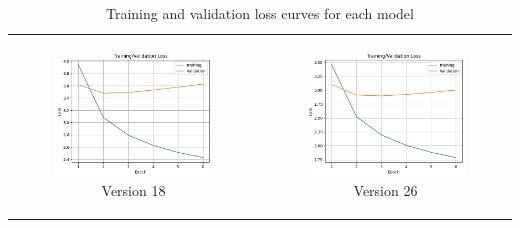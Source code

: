 \begin{table}[ht]
\begin{tabular}{cc}
    \begin{subfigure}{0.45\textwidth}
      \includegraphics[width=\linewidth]{img/curve_18.png}
      \caption{Version 18}
    \end{subfigure} & 
    \begin{subfigure}{0.45\textwidth}
      \includegraphics[width=\linewidth]{img/curve_26.png}
      \caption{Version 26}
    \end{subfigure}
  \end{tabular}
  \caption{Training and validation loss curves for each model}
  \label{tab:loss_curves}
\end{table}

